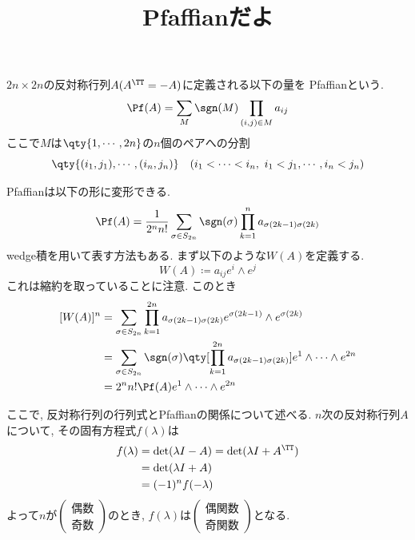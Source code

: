 \documentclass[a4paper,12pt]{jlreq}
\title{Pfaffianだよ}
\author{}
\date{}
\begin{document}
\maketitle

\begin{deftcolorbox}[title = Pfaffian]
    $2n\times 2n$の反対称行列$A(A^{\TT} = -A)$に定義される以下の量を
    Pfaffianという.
    \begin{equation}
        \Pf (A) = \sum_{M} \sgn (M) \prod_{(i,j)\in M} a_{ij}
    \end{equation}
    ここで$M$は$\qty{1,\cdots,2n}$の$n$個のペアへの分割
    \begin{equation}
        \qty{ (i_1,j_1),\cdots ,(i_n,j_n) }\quad (i_1 < \cdots < i_n,\ i_1 < j_1,\cdots , i_n < j_n)
    \end{equation}
\end{deftcolorbox}

\begin{deftcolorbox}[title = Pfaffianの他の表し方]
    Pfaffianは以下の形に変形できる.
    \begin{equation}
        \Pf (A) = \frac{1}{2^n n!} \sum_{\sigma \in S_{2n}} \sgn (\sigma) \prod_{k=1}^{n} a_{\sigma(2k-1) \sigma(2k)}
    \end{equation}
    wedge積を用いて表す方法もある. まず以下のような$W(A)$を定義する.
    \begin{equation}
        W(A) \coloneq a_{ij} e^i \wedge e^j
    \end{equation}
    これは縮約を取っていることに注意. このとき
    \begin{equation}
    \begin{aligned}
        [W(A)]^n & = \sum_{\sigma \in S_{2n}} \prod_{k=1}^{2n} a_{\sigma(2k-1) \sigma(2k)} e^{\sigma(2k-1)} \wedge e^{\sigma(2k)}\\
            & = \sum_{\sigma \in S_{2n}} \sgn (\sigma) \qty[\prod_{k=1}^{2n} a_{\sigma(2k-1) \sigma(2k)}] e^1 \wedge \cdots \wedge e^{2n}\\
            & = 2^n n! \Pf (A) e^1 \wedge \cdots \wedge e^{2n}
    \end{aligned}
    \end{equation}
\end{deftcolorbox}
\newpage
ここで, 反対称行列の行列式とPfaffianの関係について述べる.
$n$次の反対称行列$A$について, その固有方程式$f(\lambda)$は
\begin{equation}
\begin{aligned}
    f(\lambda) & = \det (\lambda I - A) = \det (\lambda I + A^{\TT})\\
    & = \det (\lambda I + A)\\
    & = (-1)^n f(-\lambda)
\end{aligned}
\end{equation}
よって$n$が$\begin{pmatrix} 偶数 \\ 奇数 \end{pmatrix}$のとき, $f(\lambda)$は$\begin{pmatrix} 偶関数 \\ 奇関数 \end{pmatrix}$となる.
\end{document}
